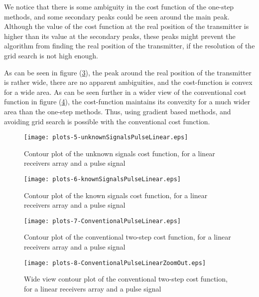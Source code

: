 We notice that there is some ambiguity in the cost function of the one-step methods, and some secondary peaks could be seen around the main peak. Although the value of the cost function at the real position of the transmitter is higher than its value at the secondary peaks, these peaks might prevent the algorithm from finding the real position of the transmitter, if the resolution of the grid search is not high enough.

As can be seen in figure (\ref{fig:conventionalPulseLinear}), the peak around the real position of the transmitter is rather wide, there are no apparent ambiguities, and the cost-function is convex for a wide area. 
As can be seen further in a wider view of the conventional cost function in figure (\ref{fig:zoomoutConventionalPulseLinear}), the cost-function maintains its convexity for a much wider area than the one-step methods.
Thus, using gradient based methods, and avoiding grid search is possible with the conventional cost function.

\begin{figure}
\begin{center}
\texttt{[image: plots-5-unknownSignalsPulseLinear.eps]} 
\end{center}
\caption{Contour plot of the unknown signals cost function, for a linear receivers array and a pulse signal}
\label{fig:unknownSignalsPulseLinear}
\end{figure}

\begin{figure}
\begin{center}
\texttt{[image: plots-6-knownSignalsPulseLinear.eps]} 
\end{center}
\caption{Contour plot of the known signals cost function, for a linear receivers array and a pulse signal}
\label{fig:knownSignalsPulseLinear}
\end{figure}

\begin{figure}
\begin{center}
\texttt{[image: plots-7-ConventionalPulseLinear.eps]} 
\end{center}
\caption{Contour plot of the conventional two-step cost function, for a linear receivers array and a pulse signal}
\label{fig:conventionalPulseLinear}
\end{figure}

\begin{figure}
\begin{center}
\texttt{[image: plots-8-ConventionalPulseLinearZoomOut.eps]} 
\end{center}
\caption{Wide view contour plot of the conventional two-step cost function, for a linear receivers array and a pulse signal}
\label{fig:zoomoutConventionalPulseLinear}
\end{figure}

